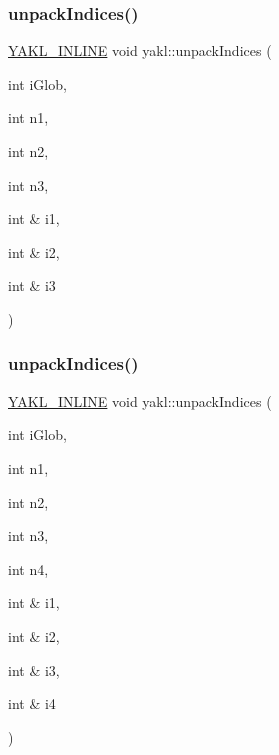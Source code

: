 \mbox{\label{namespaceyakl_a3c5dabe0c0c280c2944067d241196bcc}} 
\subsubsection{\texorpdfstring{unpack\+Indices()}{unpackIndices()}\hspace{0.1cm}{\footnotesize\ttfamily [2/7]}}
{\footnotesize\ttfamily \hyperlink{YAKL_8h_aa0dd629ffce6d564b19e9313fb91a5ad}{Y\+A\+K\+L\+\_\+\+I\+N\+L\+I\+NE} void yakl\+::unpack\+Indices (\begin{DoxyParamCaption}\item[{int}]{i\+Glob,  }\item[{int}]{n1,  }\item[{int}]{n2,  }\item[{int}]{n3,  }\item[{int \&}]{i1,  }\item[{int \&}]{i2,  }\item[{int \&}]{i3 }\end{DoxyParamCaption})}

\mbox{\label{namespaceyakl_ab40f47e063e6955cb494c8da1a7beb6e}} 
\subsubsection{\texorpdfstring{unpack\+Indices()}{unpackIndices()}\hspace{0.1cm}{\footnotesize\ttfamily [3/7]}}
{\footnotesize\ttfamily \hyperlink{YAKL_8h_aa0dd629ffce6d564b19e9313fb91a5ad}{Y\+A\+K\+L\+\_\+\+I\+N\+L\+I\+NE} void yakl\+::unpack\+Indices (\begin{DoxyParamCaption}\item[{int}]{i\+Glob,  }\item[{int}]{n1,  }\item[{int}]{n2,  }\item[{int}]{n3,  }\item[{int}]{n4,  }\item[{int \&}]{i1,  }\item[{int \&}]{i2,  }\item[{int \&}]{i3,  }\item[{int \&}]{i4 }\end{DoxyParamCaption})}

